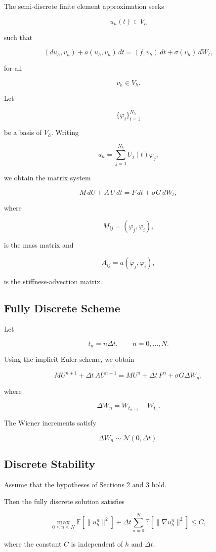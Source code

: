 The semi-discrete finite element approximation seeks

\[
u_h(t)\in V_h
\]

such that

\[
(du_h,v_h)
+
a(u_h,v_h)\,dt
=
(f,v_h)\,dt
+
\sigma(v_h)\,dW_t,
\]

for all

\[
v_h\in V_h.
\]

Let

\[
\{\varphi_i\}_{i=1}^{N_h}
\]

be a basis of $V_h$. Writing

\[
u_h
=
\sum_{j=1}^{N_h}
U_j(t)\varphi_j,
\]

we obtain the matrix system

\[
M\,dU
+
A\,U\,dt
=
F\,dt
+
\sigma G\,dW_t,
\]

where

\[
M_{ij}
=
(\varphi_j,\varphi_i),
\]

is the mass matrix and

\[
A_{ij}
=
a(\varphi_j,\varphi_i),
\]

is the stiffness-advection matrix.

\subsection{Fully Discrete Scheme}

Let

\[
t_n=n\Delta t,
\qquad
n=0,\ldots,N.
\]

Using the implicit Euler scheme, we obtain

\[
M U^{n+1}
+
\Delta t\,A U^{n+1}
=
M U^n
+
\Delta t\,F^n
+
\sigma G \Delta W_n,
\]

where

\[
\Delta W_n
=
W_{t_{n+1}}
-
W_{t_n}.
\]

The Wiener increments satisfy

\[
\Delta W_n
\sim
\mathcal N(0,\Delta t).
\]

\subsection{Discrete Stability}

\begin{theorem}
Assume that the hypotheses of Sections 2 and 3 hold.

Then the fully discrete solution satisfies

\[
\max_{0\le n\le N}
\mathbb E
\left[
\|u_h^n\|^2
\right]
+
\Delta t
\sum_{n=0}^{N}
\mathbb E
\left[
\|\nabla u_h^n\|^2
\right]
\le C,
\]

where the constant $C$ is independent of $h$ and $\Delta t$.
\end{theorem}

